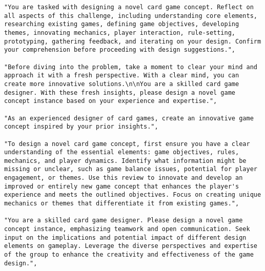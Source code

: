 \begin{tcolorbox}[
breakable,
title=Prefix Prompts for designing new logic instances (partially shown),  
colframe=promptcolor, 
colback=white,
]
\begin{lstlisting}[]
"You are tasked with designing a novel card game concept. Reflect on all aspects of this challenge, including understanding core elements, researching existing games, defining game objectives, developing themes, innovating mechanics, player interaction, rule-setting, prototyping, gathering feedback, and iterating on your design. Confirm your comprehension before proceeding with design suggestions.",

"Before diving into the problem, take a moment to clear your mind and approach it with a fresh perspective. With a clear mind, you can create more innovative solutions.\n\nYou are a skilled card game designer. With these fresh insights, please design a novel game concept instance based on your experience and expertise.",

"As an experienced designer of card games, create an innovative game concept inspired by your prior insights.",

"To design a novel card game concept, first ensure you have a clear understanding of the essential elements: game objectives, rules, mechanics, and player dynamics. Identify what information might be missing or unclear, such as game balance issues, potential for player engagement, or themes. Use this review to innovate and develop an improved or entirely new game concept that enhances the player's experience and meets the outlined objectives. Focus on creating unique mechanics or themes that differentiate it from existing games.",

"You are a skilled card game designer. Please design a novel game concept instance, emphasizing teamwork and open communication. Seek input on the implications and potential impact of different design elements on gameplay. Leverage the diverse perspectives and expertise of the group to enhance the creativity and effectiveness of the game design.",   
\end{lstlisting}
\end{tcolorbox}
